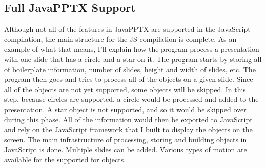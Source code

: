 \documentclass[12pt,twoside]{reedthesis}
\begin{document}
\subsection{Full JavaPPTX Support} 

Although not all of the features in JavaPPTX are supported in the JavaScript compilation, the main structure for the JS compilation is complete. As an example of what that means, I'll explain how the program process a presentation with one slide that has a circle and a star on it. The program starts by storing all of boilerplate information, number of slides, height and width of slides, etc. The program then goes and tries to process all of the objects on a given slide. Since all of the objects are not yet supported, some objects will be skipped. In this step, because circles are supported, a circle would be processed and added to the presentation. A star object is not supported, and so it would be skipped over during this phase. All of the information would then be exported to JavaScript and rely on the JavaScript framework that I built to display the objects on the screen. The main infrastructure of processing, storing and building objects in JavaScript is done. Multiple slides can be added. Various types of motion are available for the supported for objects. 
\end{document}
